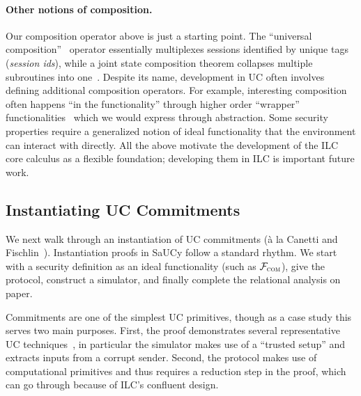 \paragraph{Other notions of composition.}
Our composition operator above is just a starting point.
The ``universal composition''~\cite{canetti2001universally} operator essentially multiplexes sessions identified by unique tags (\emph{session ids}), while a joint state composition theorem collapses multiple subroutines into one~\cite{canetti2003universal}.
Despite its name, development in UC often involves defining additional composition operators. 
For example, interesting composition often happens ``in the functionality''
through higher order ``wrapper''
functionalities~\cite{kosba2016hawk,katz2007universally} which we would express
through abstraction. Some security properties require a generalized notion of
ideal functionality that the environment can interact with directly. All the
above motivate the development of the ILC core calculus as a flexible
foundation; developing them in ILC is important future work.


\subsection{Instantiating UC Commitments}
\label{subsec:example}
We next walk through an instantiation of UC commitments (\`{a} la Canetti and
Fischlin~\cite{canetti2001commitments}).
Instantiation proofs in SaUCy follow a
standard rhythm. We start with a security definition as an ideal functionality
(such as $\mathcal{{F}}_{\textsc{com}}$), give the protocol, construct a simulator, and
finally complete the relational analysis on paper.

Commitments are one of the simplest UC primitives, though as a case study this serves two main purposes.
First, the proof demonstrates several representative UC techniques~\cite{lindell2017simulate}, in particular the simulator makes use of a ``trusted setup'' and extracts inputs from a corrupt sender.
Second, the protocol makes use of computational primitives and thus requires a reduction step in the proof, which can go through because of ILC's confluent design.


